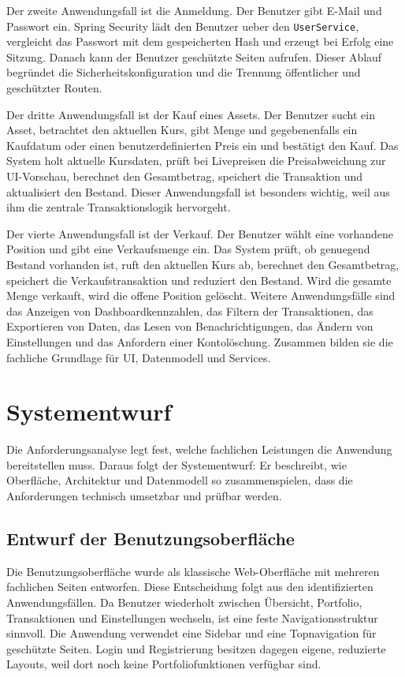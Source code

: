 \documentclass[12pt,a4paper]{article}
\begin{document}
Der zweite Anwendungsfall ist die Anmeldung. Der Benutzer gibt E-Mail und Passwort ein. Spring Security lädt den Benutzer ueber den \texttt{UserService}, vergleicht das Passwort mit dem gespeicherten Hash und erzeugt bei Erfolg eine Sitzung. Danach kann der Benutzer geschützte Seiten aufrufen. Dieser Ablauf begründet die Sicherheitskonfiguration und die Trennung öffentlicher und geschützter Routen.

Der dritte Anwendungsfall ist der Kauf eines Assets. Der Benutzer sucht ein Asset, betrachtet den aktuellen Kurs, gibt Menge und gegebenenfalls ein Kaufdatum oder einen benutzerdefinierten Preis ein und bestätigt den Kauf. Das System holt aktuelle Kursdaten, prüft bei Livepreisen die Preisabweichung zur UI-Vorschau, berechnet den Gesamtbetrag, speichert die Transaktion und aktualisiert den Bestand. Dieser Anwendungsfall ist besonders wichtig, weil aus ihm die zentrale Transaktionslogik hervorgeht.



Der vierte Anwendungsfall ist der Verkauf. Der Benutzer wählt eine vorhandene Position und gibt eine Verkaufsmenge ein. Das System prüft, ob genuegend Bestand vorhanden ist, ruft den aktuellen Kurs ab, berechnet den Gesamtbetrag, speichert die Verkaufstransaktion und reduziert den Bestand. Wird die gesamte Menge verkauft, wird die offene Position gelöscht. Weitere Anwendungsfälle sind das Anzeigen von Dashboardkennzahlen, das Filtern der Transaktionen, das Exportieren von Daten, das Lesen von Benachrichtigungen, das Ändern von Einstellungen und das Anfordern einer Kontolöschung. Zusammen bilden sie die fachliche Grundlage für UI, Datenmodell und Services.

\newpage
\section{Systementwurf}

Die Anforderungsanalyse legt fest, welche fachlichen Leistungen die Anwendung bereitstellen muss. Daraus folgt der Systementwurf: Er beschreibt, wie Oberfläche, Architektur und Datenmodell so zusammenspielen, dass die Anforderungen technisch umsetzbar und prüfbar werden.

\subsection{Entwurf der Benutzungsoberfläche}

Die Benutzungsoberfläche wurde als klassische Web-Oberfläche mit mehreren fachlichen Seiten entworfen. Diese Entscheidung folgt aus den identifizierten Anwendungsfällen. Da Benutzer wiederholt zwischen Übersicht, Portfolio, Transaktionen und Einstellungen wechseln, ist eine feste Navigationsstruktur sinnvoll. Die Anwendung verwendet eine Sidebar und eine Topnavigation für geschützte Seiten. Login und Registrierung besitzen dagegen eigene, reduzierte Layouts, weil dort noch keine Portfoliofunktionen verfügbar sind.
\end{document}
